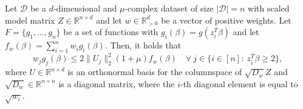 \begin{lemma}
    Let $\mathcal{D}$ be a $d$-dimensional and $\mu$-complex dataset of size
    $|\mathcal{D}|=n$ with scaled model matrix
    $Z \in \mathbb{R}^{n \times d}$ and let $w \in \mathbb{R}^d_{>0}$
    be a vector of positive weights.
    Let $F = \{g_1, ..., g_n\}$ be a set of functions with
    $g_i(\beta) = g(z_i^T \beta)$ and let
    $f_w(\beta) = \sum_{i=1}^n w_ig_i(\beta)$.
    Then, it holds that
    \begin{equation*}
        w_jg_j(\beta) \leq 2 \lVert U_j \rVert_2^2(1 + \mu)f_w(\beta) \quad
        \forall\ j \in \{i \in [n]:\ z_i^T \beta \geq 2 \},
    \end{equation*}
    where $U \in \mathbb{R}^{n \times d}$ is an orthonormal basis for
    the columnspace of $\sqrt{D_w}Z$ and $\sqrt{D_w} \in \mathbb{R}^{n \times n}$
    is a diagonal matrix, where the $i$-th diagonal element is equal to
    $\sqrt{w_i}$.
\end{lemma}
